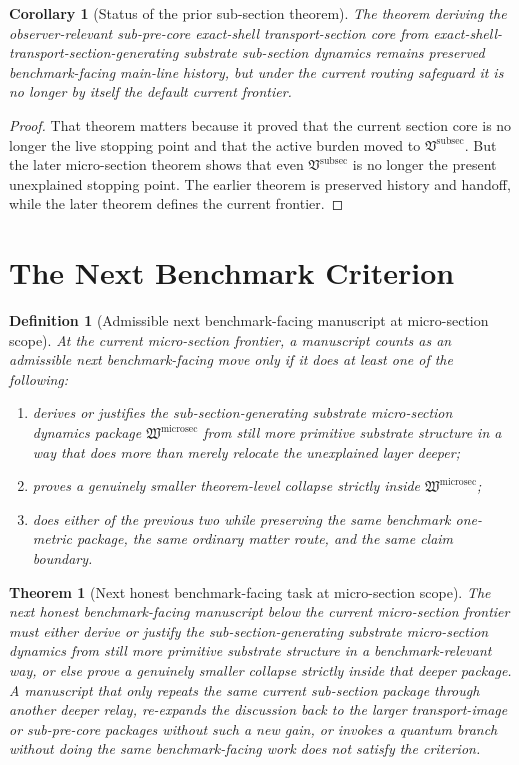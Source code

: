 \documentclass[11pt]{article}
\newcommand{\SubSectionPackage}{\mathfrak V^{\mathrm{subsec}}}
\newcommand{\MicroSectionPackage}{\mathfrak W^{\mathrm{microsec}}}
\newtheorem{definition}{Definition}
\newtheorem{corollary}{Corollary}
\newtheorem{theorem}{Theorem}
\begin{document}
\begin{corollary}[Status of the prior sub-section theorem]
The theorem deriving the observer-relevant sub-pre-core exact-shell transport-section core from exact-shell-transport-section-generating substrate sub-section dynamics remains preserved benchmark-facing main-line history, but under the current routing safeguard it is no longer by itself the default current frontier.
\end{corollary}

\begin{proof}
That theorem matters because it proved that the current section core is no longer the live stopping point and that the active burden moved to \(\SubSectionPackage\). But the later micro-section theorem shows that even \(\SubSectionPackage\) is no longer the present unexplained stopping point. The earlier theorem is preserved history and handoff, while the later theorem defines the current frontier.
\end{proof}

\section{The Next Benchmark Criterion}

\begin{definition}[Admissible next benchmark-facing manuscript at micro-section scope]
At the current micro-section frontier, a manuscript counts as an admissible next benchmark-facing move only if it does at least one of the following:
\begin{enumerate}
    \item derives or justifies the sub-section-generating substrate micro-section dynamics package \(\MicroSectionPackage\) from still more primitive substrate structure in a way that does more than merely relocate the unexplained layer deeper;
    \item proves a genuinely smaller theorem-level collapse strictly inside \(\MicroSectionPackage\);
    \item does either of the previous two while preserving the same benchmark one-metric package, the same ordinary matter route, and the same claim boundary.
\end{enumerate}
\end{definition}

\begin{theorem}[Next honest benchmark-facing task at micro-section scope]
The next honest benchmark-facing manuscript below the current micro-section frontier must either derive or justify the sub-section-generating substrate micro-section dynamics from still more primitive substrate structure in a benchmark-relevant way, or else prove a genuinely smaller collapse strictly inside that deeper package. A manuscript that only repeats the same current sub-section package through another deeper relay, re-expands the discussion back to the larger transport-image or sub-pre-core packages without such a new gain, or invokes a quantum branch without doing the same benchmark-facing work does not satisfy the criterion.
\end{theorem}
\end{document}
